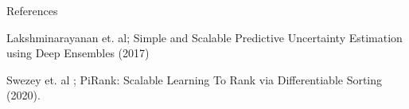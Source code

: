 \documentclass{beamer}
\begin{document}
\begin{frame}[t]{References}

\begin{thebibliography}{1}

\alert{Lakshminarayanan et.  al; Simple and Scalable Predictive Uncertainty Estimation using Deep Ensembles (2017)}

\alert{Swezey et.  al ;  PiRank: Scalable Learning To Rank via Differentiable Sorting (2020).}

\end{thebibliography}

\end{frame}

\end{document}
